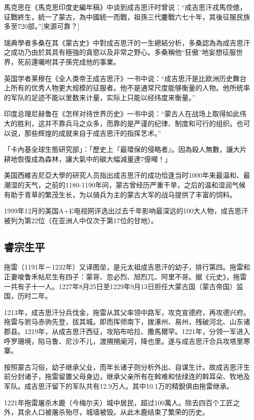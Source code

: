 馬克思在《馬克思印度史編年稿》中谈到成吉思汗时曾说：“成吉思汗戎馬倥傯，征戰終生，統一了蒙古，為中國統一而戰，祖孫三代鏖戰六七十年，其後征服民族多至720部。”[來源可靠？]

瑞典學者多桑在其《蒙古史》中對成吉思汗的一生總結分析，多桑認為為成吉思汗之成功乃由於其具有極強的貪慾以及非常之野心。多桑稱他“狂傲”地妄想征服世界，死前還囑咐其子孫完成他的事業。

英国学者莱穆在《全人类帝王成吉思汗》一书中说：“成吉思汗是比欧洲历史舞台上所有的优秀人物更大规模的征服者。他不是通常尺度能够衡量的人物。他所统率的军队的足迹不能以里数来计量，实际上只能以经纬度来衡量。”

印度总理尼赫鲁在《怎样对待世界历史》一书中说：“蒙古人在战场上取得如此伟大的胜利，这并不靠兵马之众多，而靠的是严谨的纪律、制度和可行的组织。也可以说，那些辉煌的成就来自于成吉思汗的指挥艺术。”

「卡內基全球生態研究部」：「歷史上『最環保的侵略者』。因為殺人無數，讓大片耕地恢復成為森林，讓大氣中的碳大幅減量達7億噸！」

美国西維吉尼亞大學的研究人员指出成吉思汗的成功恰逢当时1000年来最温和、最潮湿的天气，之前的1180-1190年间，蒙古曾经历严重干旱，之后的温和湿润气候有助于青草的繁茂生长，为以骑兵为主的蒙古大军的战马提供了丰富的饲料。

1999年12月的美国A+E电视网评选出过去千年影响最深远的100大人物，成吉思汗被列为第22位（在亚洲人中仅次于第17位的甘地）。

\subsection{睿宗生平}

拖雷（1191年－1232年）又译图垒，是元太祖成吉思汗的幼子，排行第四。拖雷和正妻唆鲁禾帖尼生有四子：蒙哥、忽必烈、旭烈兀、阿里不哥。据《元史》，拖雷一共有子十一人。1227年8月25日至1229年9月13日担任大蒙古国（蒙古帝国）监国，历时二年。

1213年，成吉思汗分兵伐金，拖雷从其父率领中路军，攻克宣德府，再攻德兴府。拖雷与驸马赤驹先登，拔其城。即而挥师南下，拨涿州、易州，残破河北、山东诸郡县。1219年，从成吉思汗西征，攻陷布哈拉、撒馬爾罕。1221年，分领一军进入呼罗珊境，陷马鲁、尼沙不儿，渡搠搠阑河，降也里。遂与成吉思汗合兵攻塔里寒寨。

按照蒙古习俗，幼子继承父业，而年长诸子则分析外出、自谋生计。故成吉思汗生前分封诸子，拖雷留置父母身边，继承父亲所有在斡难和怯绿连的斡耳朵、牧地及军队。成吉思汗留下的军队共有12.9万人。其中10.1万的精銳俱由拖雷继承。

1221年拖雷屠杀木鹿（今梅尔夫）城中居民，超过100萬人。除去四百个工匠之外，其余人口被屠杀殆尽，城墙被毁。从此木鹿结束了繁荣的历史。

